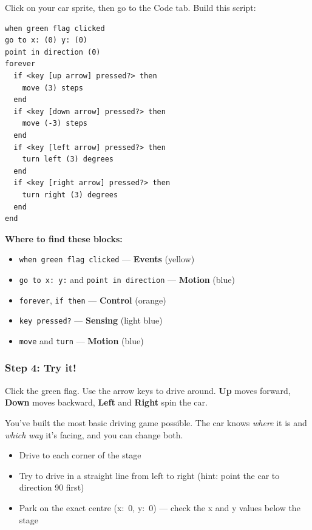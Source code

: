 \documentclass[11pt,a4paper]{article}
\begin{document}
Click on your car sprite, then go to the Code tab. Build this script:

\begin{scratchblockbox}
\begin{lstlisting}[style=scratch]
when green flag clicked
go to x: (0) y: (0)
point in direction (0)
forever
  if <key [up arrow] pressed?> then
    move (3) steps
  end
  if <key [down arrow] pressed?> then
    move (-3) steps
  end
  if <key [left arrow] pressed?> then
    turn left (3) degrees
  end
  if <key [right arrow] pressed?> then
    turn right (3) degrees
  end
end
\end{lstlisting}
\end{scratchblockbox}

\textbf{Where to find these blocks:}
\begin{itemize}[nosep]
  \item \texttt{when green flag clicked} --- \textbf{Events} (yellow)
  \item \texttt{go to x: y:} and \texttt{point in direction} --- \textbf{Motion} (blue)
  \item \texttt{forever}, \texttt{if then} --- \textbf{Control} (orange)
  \item \texttt{key pressed?} --- \textbf{Sensing} (light blue)
  \item \texttt{move} and \texttt{turn} --- \textbf{Motion} (blue)
\end{itemize}

\subsubsection{Step 4: Try it!}

Click the green flag. Use the arrow keys to drive around. \textbf{Up} moves forward, \textbf{Down} moves backward, \textbf{Left} and \textbf{Right} spin the car.

You've built the most basic driving game possible. The car knows \emph{where} it is and \emph{which way} it's facing, and you can change both.

\begin{challengebox}
\begin{itemize}[nosep]
  \item Drive to each corner of the stage
  \item Try to drive in a straight line from left to right (hint: point the car to direction 90 first)
  \item Park on the exact centre (x:~0, y:~0) --- check the x and y values below the stage
\end{itemize}
\end{challengebox}
\end{document}
